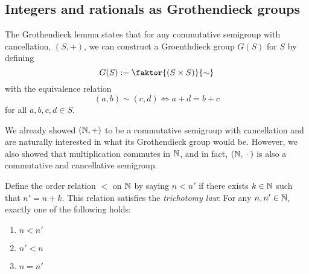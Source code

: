\documentclass[master.tex]{subfiles}
\begin{document}
\subsection{Integers and rationals as Grothendieck groups}
    The Grothendieck lemma states that for any commutative semigroup with cancellation, $(S, +)$, we can construct a Groenthdieck group $G(S)$ for $S$ by defining
    \[
        G(S) := \faktor{(S \times S)}{\sim}
    \]
    with the equivalence relation
    \[
        (a, b) \sim (c, d) \iff a + d = b + c
    \]
    for all $a, b, c, d \in S$.
    
    We already showed $(\mathbb{N}, +)$ to be a commutative semigroup with cancellation and are naturally interested in what its Grothendieck group would be.
    However, we also showed that multiplication commutes in $\mathbb{N}$, and in fact, $(\mathbb{N}, {}\cdot{}{})$ is also a commutative and cancellative semigroup.

    \begin{remark}
        Define the order relation $<$ on $\mathbb{N}$ by saying $n < n'$ if there exists $k \in \mathbb{N}$ such that $n' = n + k$.
        This relation satisfies the \emph{trichotomy law}: For any $n, n' \in \mathbb{N}$, exactly one of the following holds:
        \begin{enumerate}
            \item $n < n'$
            \item $n' < n$
            \item $n = n'$
        \end{enumerate}
    \end{remark}
\end{document}
